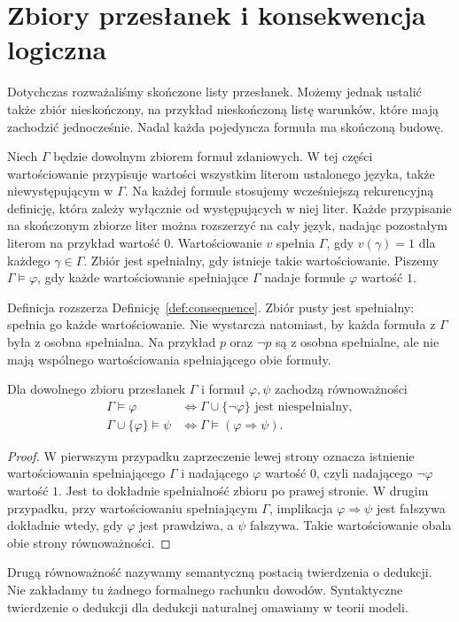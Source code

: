 \section{Zbiory przesłanek i konsekwencja logiczna}
\label{sec:lst-propositional-consequence}
Dotychczas rozważaliśmy skończone listy przesłanek.
Możemy jednak ustalić także zbiór nieskończony, na przykład
nieskończoną listę warunków, które mają zachodzić jednocześnie.
Nadal każda pojedyncza formuła ma skończoną budowę.

\begin{definicja}
\label{def:lst-propositional-theory}
Niech $\Gamma$ będzie dowolnym zbiorem formuł zdaniowych.
W tej części wartościowanie przypisuje wartości wszystkim
literom ustalonego języka, także niewystępującym w $\Gamma$.
Na każdej formule stosujemy wcześniejszą rekurencyjną
definicję, która zależy wyłącznie od występujących w niej liter.
Każde przypisanie na skończonym zbiorze liter można rozszerzyć
na cały język, nadając pozostałym literom na przykład wartość $0$.
Wartościowanie $v$ spełnia $\Gamma$, gdy $v(\gamma)=1$
dla każdego $\gamma\in\Gamma$. Zbiór jest spełnialny,
gdy istnieje takie wartościowanie.
Piszemy $\Gamma\models\varphi$, gdy każde wartościowanie
spełniające $\Gamma$ nadaje formule $\varphi$ wartość $1$.
\end{definicja}
Definicja rozszerza Definicję~\ref{def:consequence}.
Zbiór pusty jest spełnialny: spełnia go każde wartościowanie.
Nie wystarcza natomiast, by każda formuła z $\Gamma$
była z osobna spełnialna. Na przykład $p$ oraz $\neg p$
są z osobna spełnialne, ale nie mają wspólnego wartościowania
spełniającego obie formuły.

\begin{twierdzenie}
\label{thm:lst-propositional-refutation}
Dla dowolnego zbioru przesłanek $\Gamma$ i formuł
$\varphi,\psi$ zachodzą równoważności
\[
\begin{split}
 \Gamma\models\varphi
 &\iff \Gamma\cup\{\neg\varphi\}
          \text{ jest niespełnialny},\\
 \Gamma\cup\{\varphi\}\models\psi
 &\iff\Gamma\models(\varphi\Rightarrow\psi).
\end{split}
\]
\end{twierdzenie}
\begin{proof}
W pierwszym przypadku zaprzeczenie lewej strony oznacza
istnienie wartościowania spełniającego $\Gamma$ i nadającego
$\varphi$ wartość $0$, czyli nadającego $\neg\varphi$ wartość $1$.
Jest to dokładnie spełnialność zbioru po prawej stronie.
W drugim przypadku, przy wartościowaniu spełniającym $\Gamma$,
implikacja $\varphi\Rightarrow\psi$ jest fałszywa dokładnie
wtedy, gdy $\varphi$ jest prawdziwa, a $\psi$ fałszywa.
Takie wartościowanie obala obie strony równoważności.
\end{proof}
Drugą równoważność nazywamy semantyczną postacią twierdzenia
o dedukcji. Nie zakładamy tu żadnego formalnego rachunku
dowodów. Syntaktyczne twierdzenie o dedukcji dla dedukcji
naturalnej omawiamy w teorii modeli.

